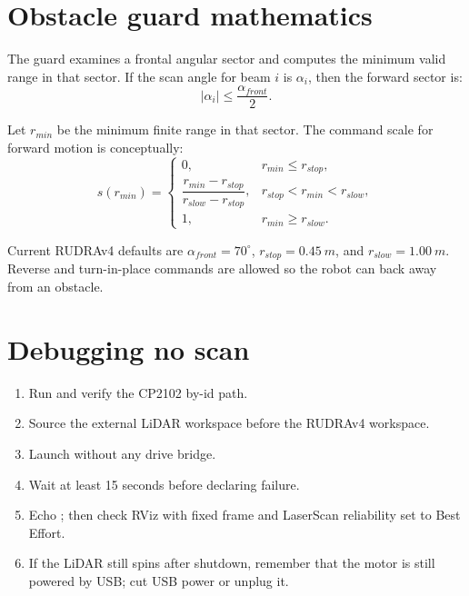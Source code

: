 \section{Obstacle guard mathematics}
The guard examines a frontal angular sector and computes the minimum valid range in that sector.  If the scan angle for beam \(i\) is \(\alpha_i\), then the forward sector is:
\begin{equation}
\left|\alpha_i\right| \leq \frac{\alpha_{front}}{2}.
\end{equation}

Let \(r_{min}\) be the minimum finite range in that sector.  The command scale for forward motion is conceptually:
\begin{equation}
s(r_{min}) =
\begin{cases}
0, & r_{min} \leq r_{stop},\\
\dfrac{r_{min}-r_{stop}}{r_{slow}-r_{stop}}, & r_{stop}<r_{min}<r_{slow},\\
1, & r_{min}\geq r_{slow}.
\end{cases}
\end{equation}

Current RUDRAv4 defaults are \(\alpha_{front}=70^\circ\), \(r_{stop}=\SI{0.45}{m}\), and \(r_{slow}=\SI{1.00}{m}\).  Reverse and turn-in-place commands are allowed so the robot can back away from an obstacle.

\section{Debugging no scan}
\begin{enumerate}
  \item Run  and verify the CP2102 by-id path.
  \item Source the external LiDAR workspace before the RUDRAv4 workspace.
  \item Launch  without any drive bridge.
  \item Wait at least 15 seconds before declaring failure.
  \item Echo ; then check RViz with fixed frame  and LaserScan reliability set to Best Effort.
  \item If the LiDAR still spins after shutdown, remember that the motor is still powered by USB; cut USB power or unplug it.
\end{enumerate}

